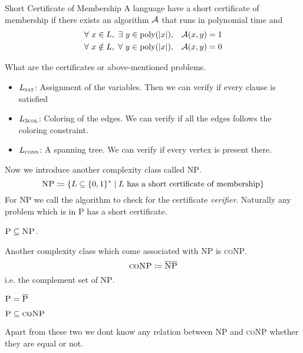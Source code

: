 \begin{definition}{Short Certificate of Membership}{}
A language have a short certificate of membership if there exists an algorithm $\mathcal{A}$ that runs in polynomial time and \begin{align*}
    \forall\ x\in L,\ \exists\ y\in \text{poly}(|x|), &\quad \mathcal{A}(x,y)=1\\ 
    \forall\ x\notin L,\ \forall\ y\in \text{poly}(|x|), &\quad  \mathcal{A}(x,y)=0
\end{align*}
\end{definition}
What are the certificates or above-mentioned problems.   \begin{itemize}
    \item $L_{\textsc{sat}}$: Assignment of the variables. Then we can verify if every clause is satisfied
    \item $L_{\textsc{3col}}$: Coloring of the edges.  We can verify if all the edges follows the coloring constraint.
    \item $L_{\textsc{conn}}$: A spanning tree. We can verify if every vertex is present there.
\end{itemize}

Now we introduce another complexity class called \textsc{NP}. $$\textsc{NP}\coloneqq \{L\subseteq \{0,1\}^*\mid L\text{ has a short certificate of membership}\}$$For \textsc{NP} we call the algorithm to check for the certificate \emph{verifier}. Naturally any problem which is in \textsc{P} has a short certificate. \begin{theorem}{}{}
$\textsc{P}\subseteq \textsc{NP}$.  
\end{theorem}
 Another complexity class which come associated with \textsc{NP} is \textsc{coNP}. $$\textsc{coNP}\coloneqq \overline{\textsc{NP}}$$i.e. the complement set of \textsc{NP}. 
 \begin{observation}
      $\textsc{P}=\overline{\textsc{P}}$
 \end{observation}
 \begin{theorem}{}{}
 $\textsc{P}\subseteq \textsc{coNP}$
 \end{theorem}
 Apart from these two we dont know any relation between \textsc{NP} and \textsc{coNP} whether they are equal or not. 